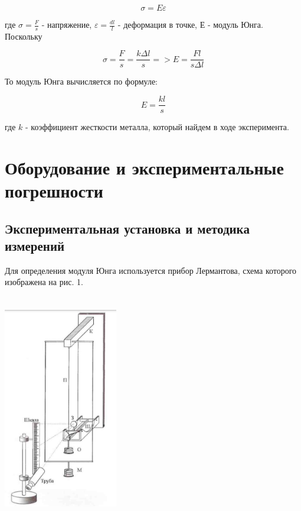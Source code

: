 \begin{equation} \label{закон гука}
    \sigma = E \varepsilon
\end{equation}

    где $\sigma = \frac{F}{s} $ - напряжение, $\varepsilon = \frac{dl}{l}$ - деформация в точке, Е - модуль Юнга.\\
    
    Поскольку
    
\begin{equation} \label{закон гука 2}
    \sigma = \frac{F}{s} = \frac{k \Delta l}{s} => E = \frac{Fl}{s \Delta l}
\end{equation}

    То модуль Юнга вычисляется по формуле:
    
\begin{equation} \label{модуль}
    E = \frac{kl}{s}
\end{equation}

    где $k$ - коэффициент жесткости металла, который найдем в ходе эксперимента.




\section{Оборудование и экспериментальные погрешности}
\subsection{Экспериментальная установка и методика измерений}

    Для определения модуля Юнга используется прибор Лермантова, схема которого изображена на рис. 1.
    
\begin{center}
\includegraphics[width=5cm, height=10cm]{lermant.jpeg}
\end{center}

